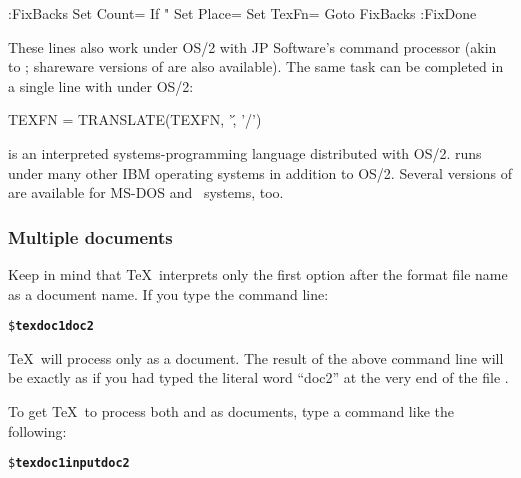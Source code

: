 \begin{shortexample}
:FixBacks
  Set Count=%
  If "%
  Set Place=%
  Set TexFn=%
  Goto FixBacks
:FixDone
\end{shortexample}

These lines also work under OS/2 with JP Software's 
command processor (akin to ;
shareware versions of  are also available).  
The same task can be completed in a single line
with  under OS/2:

\begin{shortexample}
TEXFN = TRANSLATE(TEXFN, '\', '/')
\end{shortexample}

 is an interpreted systems-programming language distributed
with OS/2.   runs under many other IBM operating systems
in addition to OS/2.  Several versions of  are available for
MS-DOS and \Unix\ systems, too.

\subsubsection{Multiple documents}

Keep in mind that \TeX\ 
interprets only the first option after the
format file name as a document name.  If you type the command line:

\begin{exindent}
\begin{alltt}
\$ \textbf{tex doc1 doc2}
\end{alltt}
\end{exindent}

\TeX\ will process only  as a document.  The result
of the above 
command line will 
be exactly as if you had typed the
literal word ``doc2'' at the very end of the file .

To get \TeX\ to process both  and  as documents,
type a command like the following:

\begin{exindent}
\begin{alltt}
\$ \textbf{tex doc1 {\bs}input doc2}
\end{alltt}
\end{exindent}

